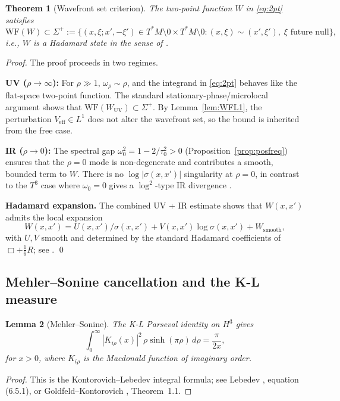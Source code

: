 \documentclass[12pt,letterpaper]{article}
\newtheorem{theorem}{Theorem}[section]
\newtheorem{lemma}[theorem]{Lemma}
\newcommand{\WF}{\mathrm{WF}}
\begin{document}
\begin{theorem}[Wavefront set criterion]
\label{thm:wfset}
The two-point function $W$ in \eqref{eq:2pt} satisfies
\begin{equation}
  \WF(W) \subset \Sigma^+
  := \bigl\{(x,\xi;x',-\xi') \in T^*M\setminus 0 \times T^*M\setminus 0:
  (x,\xi)\sim(x',\xi'),\; \xi \text{ future null}\bigr\},
  \label{eq:Radzikowski}
\end{equation}
i.e., $W$ is a Hadamard state in the sense of \cite{Radzikowski96}.
\end{theorem}
\begin{proof}
The proof proceeds in two regimes.

\textbf{UV ($\rho \to \infty$):}
For $\rho \gg 1$, $\omega_\rho \sim \rho$, and the integrand
in \eqref{eq:2pt} behaves like the flat-space two-point function.
The standard stationary-phase/microlocal argument
\cite{Radzikowski96,Duistermaat-Guillemin75} shows that
$\WF(W_{\mathrm{UV}}) \subset \Sigma^+$.
By Lemma~\ref{lem:WFL1}, the perturbation $V_{\mathrm{eff}}\in L^{1}$
does not alter the wavefront set, so the bound is inherited from the
free case.

\textbf{IR ($\rho \to 0$):}
The spectral gap $\omega_0^2 = 1 - 2/\tau_0^2 > 0$
(Proposition~\ref{prop:posfreq}) ensures that the $\rho=0$ mode is
non-degenerate and contributes a smooth, bounded term to $W$.
There is no $\log|\sigma(x,x')|$ singularity at $\rho=0$, in contrast
to the $T^3$ case where $\omega_0 = 0$ gives a $\log^2$-type IR
divergence \cite{BN23}.

\textbf{Hadamard expansion.}
The combined UV + IR estimate shows that $W(x,x')$ admits the local
expansion
\[
  W(x,x') = U(x,x')/\sigma(x,x') + V(x,x')\log\sigma(x,x') + W_{\mathrm{smooth}},
\]
with $U,V$ smooth and determined by the standard Hadamard coefficients
of $\Box + \tfrac{1}{6}R$; see \cite{Wald94,Moretti21}.
\qed
\end{proof}

\subsection{Mehler--Sonine cancellation and the K-L measure}

\begin{lemma}[Mehler--Sonine]
\label{lem:MS}
The K-L Parseval identity on $H^3$ gives
\begin{equation}
  \int_0^\infty |K_{i\rho}(x)|^2\,\rho\sinh(\pi\rho)\,d\rho
  = \frac{\pi}{2x},
  \label{eq:MS}
\end{equation}
for $x > 0$, where $K_{i\rho}$ is the Macdonald function of imaginary order.
\end{lemma}
\begin{proof}
This is the Kontorovich--Lebedev integral formula;
see Lebedev \cite{Lebedev65}, equation (6.5.1), or
Goldfeld--Kontorovich \cite{GK11}, Theorem~1.1.
\end{proof}
\end{document}
